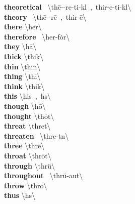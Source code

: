 \documentclass[10pt,a4paper]{article}
\begin{document}
\begin{multicols}{2}
\textbf{ theoretical }\quad \ \textbackslash \textsecstress th\={e}-\textschwa -\textprimstress re-ti-k\textschwa l\ ,\ \textsecstress thir-\textprimstress e-ti-k\textschwa l\textbackslash \\
\textbf{ theory }\quad \ \textbackslash \textprimstress th\={e}-\textschwa -r\={e}\ ,\ \textprimstress thir-\={e}\textbackslash \\
\textbf{ there }\quad \textbackslash \textprimstress  her\textbackslash \\
\textbf{ therefore }\quad \ \textbackslash \textprimstress  her-\textsecstress f\.{o}r\textbackslash \\
\textbf{ they }\quad \textbackslash \textprimstress  h\={a}\textbackslash \\
\textbf{ thick }\quad \textbackslash \textprimstress thik\textbackslash \\
\textbf{ thin }\quad \textbackslash \textprimstress thin\textbackslash \\
\textbf{ thing }\quad \textbackslash \textprimstress thi\engma \textbackslash \\
\textbf{ think }\quad \textbackslash \textprimstress thi\engma k\textbackslash \\
\textbf{ this }\quad \textbackslash \textprimstress  his\ ,\  h\textschwa s\textbackslash \\
\textbf{ though }\quad \textbackslash \textprimstress  h\={o}\textbackslash \\
\textbf{ thought }\quad \textbackslash \textprimstress th\.{o}t\textbackslash \\
\textbf{ threat }\quad \textbackslash \textprimstress thret\textbackslash \\
\textbf{ threaten }\quad \ \textbackslash \textprimstress thre-t\textsuperscript{\textreve}n\textbackslash \\
\textbf{ three }\quad \textbackslash \textprimstress thr\={e}\textbackslash \\
\textbf{ throat }\quad \textbackslash \textprimstress thr\={o}t\textbackslash \\
\textbf{ through }\quad \textbackslash \textprimstress thr\"{u}\textbackslash \\
\textbf{ throughout }\quad \ \textbackslash thr\"{u}-\textprimstress au\. t\textbackslash \\
\textbf{ throw }\quad \textbackslash \textprimstress thr\={o}\textbackslash \\
\textbf{ thus }\quad \textbackslash \textprimstress  h\textschwa s\textbackslash \\

\end{multicols}
\end{document}

